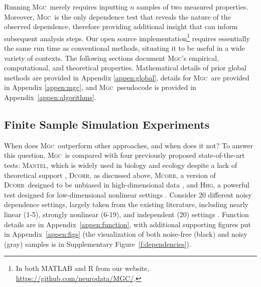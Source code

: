 \documentclass[11pt]{article}
\providecommand{\sct}[1]{{\normalfont\textsc{#1}}}
\newcommand{\Mgc}{\sct{Mgc}}
\newcommand{\Hhg}{\sct{Hhg}}
\newcommand{\Dcorr}{\sct{Dcorr}}
\newcommand{\Mcorr}{\sct{Mcorr}}
\newcommand{\Mantel}{\sct{Mantel}}
\newcommand{\website}{\url{https://github.com/neurodata/MGC/}}
\begin{document}
Running \Mgc~merely requires inputting $n$ samples of two measured properties.  
Moreover, \Mgc~is the only dependence test that reveals the nature of the observed dependence, therefore providing additional insight that can inform subsequent analysis steps.
Our open source implementation\footnote{In both MATLAB and R from our website, \website.} requires essentially the same run time as conventional methods, situating it to be useful in a wide variety of contexts. 
The following sections document \Mgc's empirical, computational, and theoretical properties. Mathematical details of prior global methods are provided in Appendix \ref{appen:global}, details for \Mgc~are provided in Appendix \ref{appen:mgc}, and \Mgc~pseudocode is provided in Appendix~\ref{appen:algorithms}.



\subsection*{Finite Sample Simulation Experiments}

When does \Mgc~outperform other approaches, and when does it not?
To answer this question, \Mgc~is compared with four previously proposed state-of-the-art tests: \Mantel, which is widely used in biology and ecology despite a lack of theoretical support \cite{Mantel1967}, \Dcorr, as discussed above, \Mcorr, a version of \Dcorr~designed to be unbiased in high-dimensional data \cite{SzekelyRizzo2013a}, and \Hhg, a powerful test designed for low-dimensional nonlinear settings \cite{HellerGorfine2013}. 
Consider $20$ different noisy dependence settings, largely taken from the existing literature, including  nearly linear (1-5), strongly nonlinear (6-19), and independent (20) settings \cite{SzekelyRizzoBakirov2007, SimonTibshirani2012, GorfineHellerHeller2012, HellerGorfine2013, SzekelyRizzo2013a}.  
Function details are in Appendix~\ref{appen:function}, with additional supporting figures put in Appendix~\ref{appen:figs} (the visualization of both noise-free (black) and noisy (gray) samples is in Supplementary Figure~\ref{f:dependencies}).  
\end{document}
